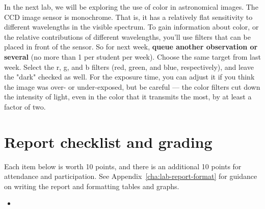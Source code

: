 In the next lab, we will be exploring the use of color in astronomical images. The CCD image sensor is monochrome. That is, it has a relatively flat sensitivity to different wavelengths in the visible spectrum. To gain information about color, or the relative contributions of different wavelengths, you'll use filters that can be placed in front of the sensor. So for next week, \textbf{queue another observation or several} (no more than 1 per student per week). Choose the same target from last week. Select the r, g, and b filters (red, green, and blue, respectively), and leave the "dark" checked as well. For the exposure time, you can adjust it if you think the image was over- or under-exposed, but be careful --- the color filters cut down the intensity of light, even in the color that it transmits the most, by at least a factor of two.

\section{Report checklist and grading}

Each item below is worth 10 points, and there is an additional 10 points for attendance and participation. See Appendix\ \ref{cha:lab-report-format} for guidance on writing the report and formatting tables and graphs.

\begin{itemize}
	
	\item 
	
\end{itemize}